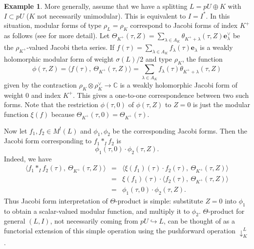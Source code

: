 \documentclass[12pt]{amsart}
\numberwithin{equation}{section}
\theoremstyle{definition}
\newtheorem{example}[theorem]{Example}
\theoremstyle{remark}
\newcommand{\C}{\mathbb{C}}
\newcommand{\elambda}{{\mathbf e}_{\lambda}}
\newcommand{\ML}{M^{!}(L)}
\begin{document}
\begin{example}\label{ex: Jacobi form}
More generally, assume that we have a splitting 
$L=pU\oplus K$ with $I\subset pU$ ($K$ not necessarily unimodular). 
This is equivalent to $I=I^{\ast}$. 
In this situation, modular forms of type $\rho_{L}=\rho_{K}$ 
correspond to Jacobi forms of index $K^{+}$ as follows (see \cite{Gr} for more detail). 
Let 
$\Theta_{K^{+}}(\tau, Z) = \sum_{\lambda\in A_{K}} \theta_{K^{+}+\lambda}(\tau, Z)\mathbf{e}_{\lambda}^{\vee}$ 
be the $\rho_{K^{+}}$-valued Jacobi theta series. 
If $f(\tau)=\sum_{\lambda\in A_K}f_{\lambda}(\tau){\elambda}$ 
is a weakly holomorphic modular form of weight $\sigma(L)/2$ and type $\rho_{K}$, 
the function 
\begin{equation*}
\phi(\tau, Z) 
= \langle f(\tau), \: \Theta_{K^{+}}(\tau, Z) \rangle 
= \sum_{\lambda\in A_{K}} f_{\lambda}(\tau)\theta_{K^{+}+\lambda}(\tau, Z) 
\end{equation*}
given by the contraction 
$\rho_K\otimes \rho_K^{\vee} \to {\C}$ 
is a weakly holomorphic Jacobi form of weight $0$ and index $K^{+}$. 
This gives a one-to-one correspondence between two such forms. 
Note that 
the restriction $\phi(\tau, 0)$ of $\phi(\tau, Z)$ to $Z=0$  
is just the modular function $\xi(f)$ because 
$\Theta_{K^{+}}(\tau, 0) = \Theta_{K^{+}}(\tau)$. 

Now let $f_1, f_2 \in {\ML}$ 
and $\phi_1, \phi_2$ be the corresponding Jacobi forms. 
Then the Jacobi form corresponding to $f_1\ast_{I} f_2$ is 
\begin{equation*}
\phi_1(\tau, 0) \cdot \phi_2(\tau, Z). 
\end{equation*}
Indeed, we have 
\begin{eqnarray*}
\langle f_1\ast_{I} f_2(\tau), \: \Theta_{K^{+}}(\tau, Z) \rangle 
& = & 
\langle \xi(f_{1})(\tau) \cdot f_2(\tau), \: \Theta_{K^{+}}(\tau, Z) \rangle \\ 
& = &  
 \xi(f_{1})(\tau) \cdot \langle f_2(\tau), \: \Theta_{K^{+}}(\tau, Z) \rangle \\ 
& = &  
\phi_1(\tau, 0) \cdot \phi_2(\tau, Z). 
\end{eqnarray*}
Thus Jacobi form interpretation of $\Theta$-product is simple: 
substitute $Z=0$ into $\phi_1$ to obtain a scalar-valued modular function, 
and multiply it to $\phi_2$. 
$\Theta$-product for general $(L, I)$, not necessarily coming from $pU\hookrightarrow L$, 
can be thought of as a functorial extension of this simple operation using the pushforward operation $\downarrow^{L}_{K}$. 
\end{example}
\end{document}
